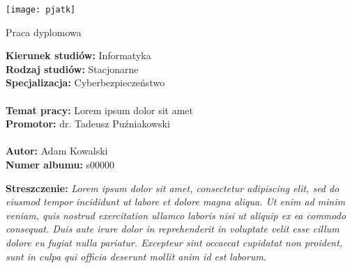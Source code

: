 \thispagestyle{empty}

\texttt{[image: pjatk]}\\

\begin{center}
    \Huge
    Praca dyplomowa
\end{center}

\vspace{5em}

\textbf{Kierunek studiów:} Informatyka\\
\textbf{Rodzaj studiów:} Stacjonarne\\
\textbf{Specjalizacja:} Cyberbezpieczeństwo\\
\\
\textbf{Temat pracy:} Lorem ipsum dolor sit amet\\
\textbf{Promotor:} dr. Tadeusz Puźniakowski\\
\\
\textbf{Autor:} Adam Kowalski\\
\textbf{Numer albumu:} s00000\\

\vspace*{2em}

\textbf{Streszczenie:}
\textsl{Lorem ipsum dolor sit amet, consectetur adipiscing elit, sed do eiusmod tempor incididunt ut labore et dolore magna aliqua. Ut enim ad minim veniam, quis nostrud exercitation ullamco laboris nisi ut aliquip ex ea commodo consequat. Duis aute irure dolor in reprehenderit in voluptate velit esse cillum dolore eu fugiat nulla pariatur. Excepteur sint occaecat cupidatat non proident, sunt in culpa qui officia deserunt mollit anim id est laborum.}